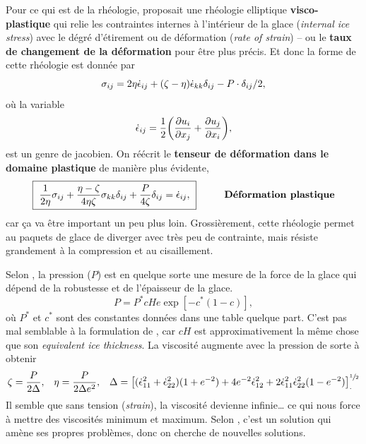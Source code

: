 \documentclass[10pt]{article}
\numberwithin{equation}{section}
\begin{document}
Pour ce qui est de la rhéologie, \Textcite{hibler1979dynamic} proposait une rhéologie elliptique \textbf{visco-plastique} qui relie les contraintes internes à l'intérieur de la glace (\emph{internal ice stress}) avec le dégré  d'étirement ou de déformation (\emph{rate of strain}) -- ou le \textbf{taux de changement de la déformation} pour être plus précis. 
Et donc la forme de cette rhéologie est donnée par
\begin{equation}
\label{eq:orgb331085}
   \sigma_{ij} = 2 \eta \dot{\epsilon}_{ij} + \qty(\zeta - \eta) \dot{\epsilon}_{kk} \delta_{ij} - P \cdot\delta_{ij}/2,
\end{equation}
où la variable
\begin{equation}
   \dot{\epsilon}_{ij} = \frac{1}{2} \qty(\pdv{u_i}{x_j}+\pdv{u_j}{x_i}),
\end{equation}
est un genre de jacobien.
On réécrit le \textbf{tenseur de déformation dans le domaine plastique} de manière plus évidente,
\begin{equation}
\label{eq:orgc97a849}
   \boxed{\ \frac{1}{2\eta} \sigma_{ij} + \frac{\eta-\zeta}{4\eta\zeta} \sigma_{kk}\delta_{ij} + \frac{P}{4\zeta} \delta_{ij} = \dot{\epsilon}_{ij},\ }\hspace{1cm}\text{\textbf{Déformation plastique}}
\end{equation}
car ça va être important un peu plus loin.
Grossièrement, cette rhéologie permet au paquets de glace de diverger avec très peu de contrainte, mais résiste grandement à la compression et au cisaillement.\bigskip

Selon \Textcite{hunke1997elastic}, la pression (\(P\)) est en quelque sorte une mesure de la force de la glace qui dépend de la robustesse et de l'épaisseur de la glace.
\begin{equation}
   P = P^\ast c He \exp[-c^\ast(1-c)],
\end{equation}
où \(P^\ast\) et \(c^\ast\) sont des constantes données dans une table quelque part.
C'est pas mal semblable à la formulation de \Textcite{hibler1979dynamic}, car \(cH\) est approximativement la même chose que son \emph{equivalent ice thickness}.
La viscosité augmente avec la pression de sorte à obtenir
\begin{align}
   \zeta = \frac{P}{2\Delta}, && \eta = \frac{P}{2\Delta e^2}, && \Delta = \qty[(\dot{\epsilon}^2_{11} + \dot{\epsilon}^2_{22})(1 + e^{-2}) + 4 e^{-2}\dot{\epsilon}^2_{12} + 2 \dot{\epsilon}^2_{11}\dot{\epsilon}^2_{22}(1-e^{-2})]^{\sfrac{1}{2}}_.
\end{align}
Il semble que sans tension (\emph{strain}), la viscosité devienne infinie\ldots{} ce qui nous force à mettre des viscosités minimum et maximum.
Selon \citeauthor*{hunke1997elastic}, c'est un solution qui amène ses propres problèmes, donc on cherche de nouvelles solutions.\bigskip
\end{document}
